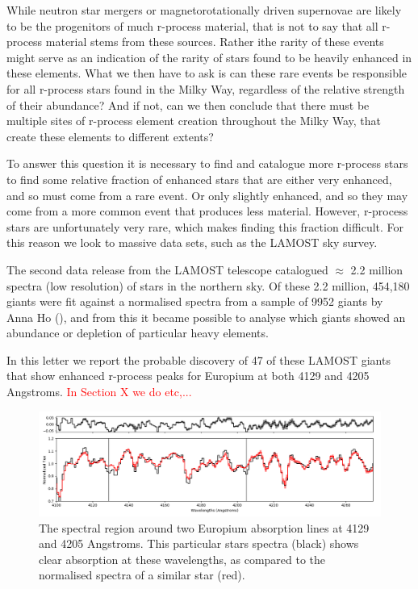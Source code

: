 \documentclass[a4paper,fleqn,usenatbib]{mnras}
\newcommand{\todo}[1]{\textcolor{red}{#1}}
\begin{document}
	While neutron star mergers or magnetorotationally driven supernovae are likely to be the progenitors of much r-process material, that is not to say that all r-process material stems from these sources. Rather ithe rarity of these events might serve as an indication of the rarity of stars found to be heavily enhanced in these elements. What we then have to ask is can these rare events be responsible for all r-process stars found in the Milky Way, regardless of the relative strength of their abundance? And if not, can we then conclude that there must be multiple sites of r-process element creation throughout the Milky Way, that create these elements to different extents?
	
	To answer this question it is necessary to find and catalogue more r-process stars to find some relative fraction of enhanced stars that are either very enhanced, and so must come from a rare event. Or only slightly enhanced, and so they may come from a more common event that produces less material. However, r-process stars are unfortunately very rare, which makes finding this fraction difficult. For this reason we look to massive data sets, such as the LAMOST sky survey.
	
	The second data release from the LAMOST telescope catalogued $\approx$ 2.2 million spectra (low resolution) of stars in the northern sky. Of these 2.2 million, 454,180 giants were fit against a normalised spectra from a sample of 9952 giants by Anna Ho (\cite{AnnaHo2017}), and from this it became possible to analyse which giants showed an abundance or depletion of particular heavy elements. 
	
	In this letter we report the probable discovery of 47 of these LAMOST giants that show enhanced r-process peaks for Europium at both 4129 and 4205 Angstroms.
	\todo{In Section X we do etc,...}

	
	\begin{figure}
		\includegraphics[width=\columnwidth]{423451}
		\caption{The spectral region around two Europium absorption lines at 4129 and 4205 Angstroms. This particular stars spectra (black) shows clear absorption at these wavelengths, as compared to the normalised spectra of a similar star (red).}
		\label{fig:starindex_423451}
	\end{figure}
	
\end{document}
